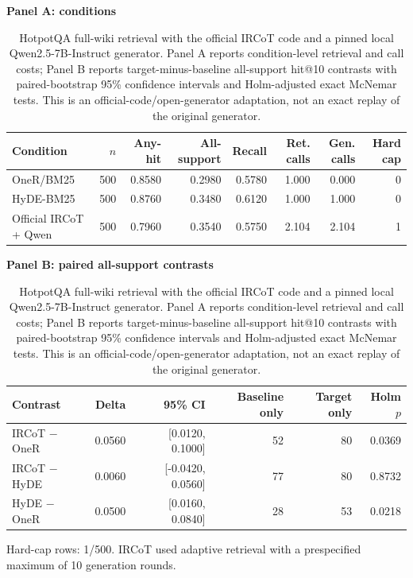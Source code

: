 \begin{table}[htbp]
\centering
\caption{HotpotQA full-wiki retrieval with the official IRCoT code and a pinned local Qwen2.5-7B-Instruct generator. Panel A reports condition-level retrieval and call costs; Panel B reports target-minus-baseline all-support hit@10 contrasts with paired-bootstrap 95\% confidence intervals and Holm-adjusted exact McNemar tests. This is an official-code/open-generator adaptation, not an exact replay of the original generator.}
\label{tab:ircot_fullwiki}
\footnotesize
\setlength{\tabcolsep}{2pt}
\textbf{Panel A: conditions}\\[2pt]
\begin{tabular}{lrrrrrrr}
\toprule
Condition & $n$ & Any-hit & All-support & Recall & Ret. calls & Gen. calls & Hard cap \\
\midrule
OneR/BM25 & 500 & 0.8580 & 0.2980 & 0.5780 & 1.000 & 0.000 & 0 \\
HyDE-BM25 & 500 & 0.8760 & 0.3480 & 0.6120 & 1.000 & 1.000 & 0 \\
Official IRCoT + Qwen & 500 & 0.7960 & 0.3540 & 0.5750 & 2.104 & 2.104 & 1 \\
\bottomrule
\end{tabular}
\vspace{5pt}
\textbf{Panel B: paired all-support contrasts}\\[2pt]
\begin{tabular}{lrrrrr}
\toprule
Contrast & Delta & 95\% CI & Baseline only & Target only & Holm $p$ \\
\midrule
IRCoT $-$ OneR & 0.0560 & [0.0120, 0.1000] & 52 & 80 & 0.0369 \\
IRCoT $-$ HyDE & 0.0060 & [-0.0420, 0.0560] & 77 & 80 & 0.8732 \\
HyDE $-$ OneR & 0.0500 & [0.0160, 0.0840] & 28 & 53 & 0.0218 \\
\bottomrule
\end{tabular}
\par\vspace{3pt}\noindent\parbox{0.96\linewidth}{\footnotesize Hard-cap rows: 1/500. IRCoT used adaptive retrieval with a prespecified maximum of 10 generation rounds.}
\end{table}
